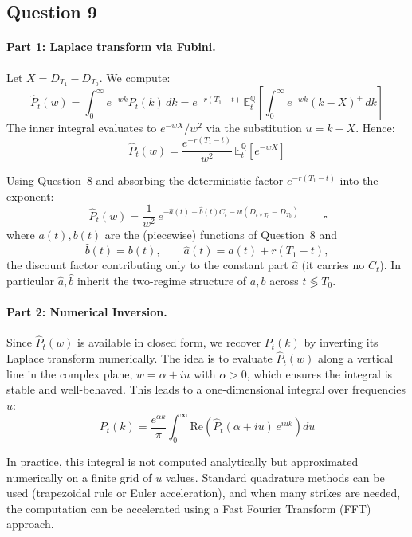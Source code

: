 \documentclass[12pt,a4paper]{article}
\begin{document}
\subsection*{Question 9}

\paragraph{Part 1: Laplace transform via Fubini.}
Let $X = D_{T_1} - D_{T_0}$. We compute:
\begin{equation*}
    \hat{P}_t(w) = \int_0^\infty e^{-wk} P_t(k)\,dk = e^{-r(T_1-t)}\,\mathbb{E}^{\mathbb{Q}}_t\!\left[\int_0^\infty e^{-wk}(k - X)^+\,dk\right]
\end{equation*}
The inner integral evaluates to $e^{-wX}/w^2$ via the substitution $u = k - X$. Hence:
\begin{equation*}
    \hat{P}_t(w) = \frac{e^{-r(T_1-t)}}{w^2}\,\mathbb{E}^{\mathbb{Q}}_t[e^{-wX}]
\end{equation*}

Using Question~8 and absorbing the deterministic factor $e^{-r(T_1-t)}$ into the exponent:
\begin{equation*}
    \boxed{\,\hat{P}_t(w) = \frac{1}{w^2}\,e^{-\hat{a}(t) - \hat{b}(t)C_t - w(D_{t \vee T_0} - D_{T_0})}\,} \qquad \square
\end{equation*}
where $a(t),b(t)$ are the (piecewise) functions of Question~8 and
\[
\hat{b}(t) = b(t), \qquad \hat{a}(t) = a(t) + r(T_1 - t),
\]
the discount factor contributing only to the constant part $\hat{a}$ (it carries no $C_t$). In particular $\hat{a},\hat{b}$ inherit the two-regime structure of $a,b$ across $t \lessgtr T_0$.

\paragraph{Part 2: Numerical Inversion.}
Since $\hat{P}_t(w)$ is available in closed form, we recover $P_t(k)$ by inverting its Laplace transform numerically. The idea is to evaluate $\hat{P}_t(w)$ along a vertical line in the complex plane, $w = \alpha + iu$ with $\alpha > 0$, which ensures the integral is stable and well-behaved.
This leads to a one-dimensional integral over frequencies $u$:
\begin{equation*}
P_t(k)
= \frac{e^{\alpha k}}{\pi}
\int_0^\infty \mathrm{Re}\!\left(\hat{P}_t(\alpha + iu)\,e^{iuk}\right)du
\end{equation*}

In practice, this integral is not computed analytically but approximated numerically on a finite grid of $u$ values. Standard quadrature methods can be used (trapezoidal rule or Euler acceleration), and when many strikes are needed, the computation can be accelerated using a Fast Fourier Transform (FFT) approach.
\end{document}
